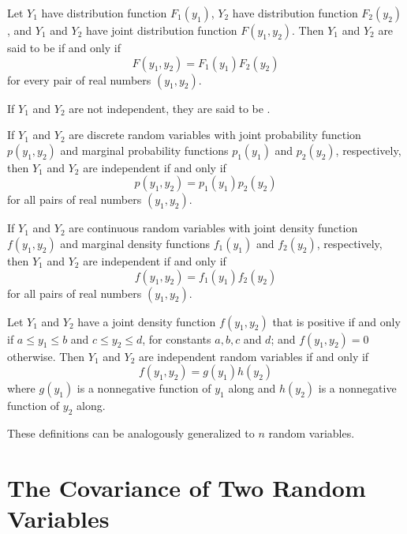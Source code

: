 \documentclass[12pt, a4paper, twoside, openright, titlepage]{book}
\begin{document}
\begin{defn}{}{}
    Let $Y_1$ have distribution function $F_1(y_1)$, $Y_2$ have distribution function $F_2(y_2)$, and $Y_1$ and $Y_2$ have joint distribution function $F(y_1,y_2)$. Then $Y_1$ and $Y_2$ are said to be  if and only if \begin{equation*}
        F(y_1,y_2) = F_1(y_1)F_2(y_2)
    \end{equation*}
    for every pair of real numbers $(y_1,y_2)$.

    If $Y_1$ and $Y_2$ are not independent, they are said to be .
\end{defn}

\begin{thm}{}{}
    If $Y_1$ and $Y_2$ are discrete random variables with joint probability function $p(y_1,y_2)$ and marginal probability functions $p_1(y_1)$ and $p_2(y_2)$, respectively, then $Y_1$ and $Y_2$ are independent if and only if \begin{equation*}
        p(y_1,y_2) = p_1(y_1)p_2(y_2)
    \end{equation*}
    for all pairs of real numbers $(y_1,y_2)$.

    If $Y_1$ and $Y_2$ are continuous random variables with joint density function $f(y_1,y_2)$ and marginal density functions $f_1(y_1)$ and $f_2(y_2)$, respectively, then $Y_1$ and $Y_2$ are independent if and only if \begin{equation*}
        f(y_1,y_2) = f_1(y_1)f_2(y_2)
    \end{equation*}
    for all pairs of real numbers $(y_1,y_2)$.
\end{thm}

\begin{thm}{}{}
    Let $Y_1$ and $Y_2$ have a joint density function $f(y_1,y_2)$ that is positive if and only if $a \leq y_1 \leq b$ and $c \leq y_2 \leq d$, for constants $a,b,c$ and $d$; and $f(y_1,y_2) = 0$ otherwise. Then $Y_1$ and $Y_2$ are independent random variables if and only if \begin{equation*}
        f(y_1,y_2) = g(y_1)h(y_2)
    \end{equation*}
    where $g(y_1)$ is a nonnegative function of $y_1$ along and $h(y_2)$ is a nonnegative function of $y_2$ along.
\end{thm}

These definitions can be analogously generalized to $n$ random variables.


\section{\textsection The Covariance of Two Random Variables}
\end{document}
